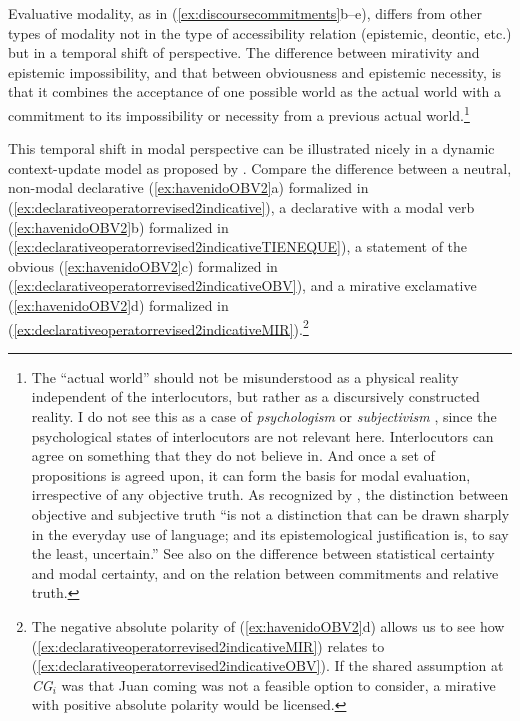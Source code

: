 Evaluative modality, as in (\ref{ex:discoursecommitments}b–e), differs from other types of modality not in the type of accessibility relation (epistemic, deontic, etc.) but in a temporal shift of perspective. The difference between mirativity and epistemic impossibility, and that between obviousness and epistemic necessity, is that it combines the acceptance of one possible world as the actual world with a commitment to its impossibility or necessity from a previous actual world.\footnote{The ``actual world'' should not be misunderstood as a physical reality independent of the interlocutors, but rather as a discursively constructed reality. I do not see this as a case of \textit{psychologism} \citep[4--5]{BradleySwartz.1979} or \textit{subjectivism} \citep[122--129]{Portner.2009}, since the psychological states of interlocutors are not relevant here. Interlocutors can agree on something that they do not believe in. And once a set of propositions is agreed upon, it can form the basis for modal evaluation, irrespective of any objective truth. As recognized by \citet[797]{Lyons.1977}, the distinction between objective and subjective truth ``is not a distinction that can be drawn sharply in the everyday use of language; and its epistemological justification is, to say the least, uncertain.'' See also \citet[73--74]{Portner.2009} on the difference between statistical certainty and modal certainty, and \citet{MacFarlane.2014} on the relation between commitments and relative truth.}

This temporal shift in modal perspective can be illustrated nicely in a dynamic context-update model as proposed by \citet{FarkasBruce.2010}. Compare the difference between a neutral, non-modal declarative (\ref{ex:havenidoOBV2}a) formalized in (\ref{ex:declarativeoperatorrevised2indicative}), a declarative with a modal verb (\ref{ex:havenidoOBV2}b) formalized in (\ref{ex:declarativeoperatorrevised2indicativeTIENEQUE}), a statement of the obvious (\ref{ex:havenidoOBV2}c) formalized in (\ref{ex:declarativeoperatorrevised2indicativeOBV}), and a mirative exclamative (\ref{ex:havenidoOBV2}d) formalized in (\ref{ex:declarativeoperatorrevised2indicativeMIR}).\footnote{The negative absolute polarity of (\ref{ex:havenidoOBV2}d) allows us to see how (\ref{ex:declarativeoperatorrevised2indicativeMIR}) relates to (\ref{ex:declarativeoperatorrevised2indicativeOBV}). If the shared assumption at \textit{CG}$_i$ was that Juan coming was not a feasible option to consider, a mirative with positive absolute polarity would be licensed.} 

